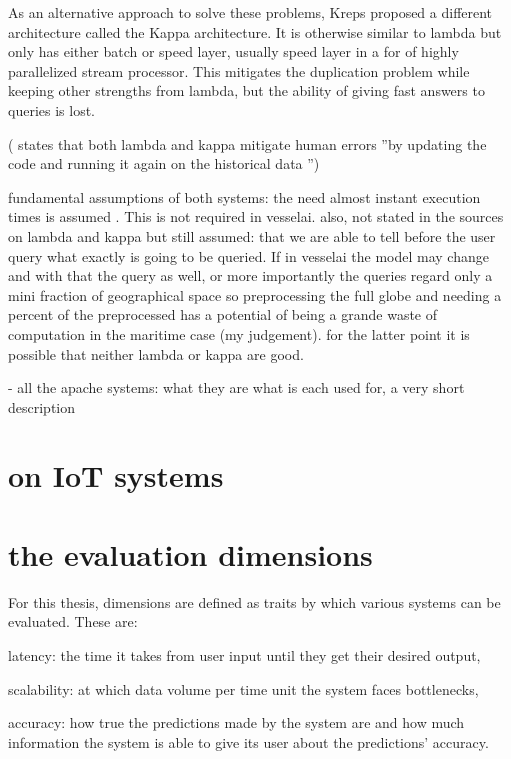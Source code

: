 As an alternative approach to solve these problems, Kreps proposed a different architecture called the Kappa architecture. It is otherwise similar to lambda but only has either batch or speed layer, usually speed layer in a for of highly parallelized stream processor. This mitigates the duplication problem while keeping other strengths from lambda, but the ability of giving fast answers to queries is lost.

(\cite{D1.1} states that both lambda and kappa mitigate human errors ''by  updating  the  code  and  running  it  again  on  the historical  data '')


fundamental assumptions of both systems:  the need almost instant execution times is assumed \cite{lambdakappa}. This is not required in vesselai. also, not stated in the sources on lambda and kappa but still assumed: that we are able to tell before the user query what exactly is going to be queried. If in vesselai the model may change and with that the query as well, or more importantly the queries regard only a mini fraction of geographical space so preprocessing the full globe and needing a percent of the preprocessed has a potential of being a grande waste of computation in the maritime case (my judgement). for the latter point it is possible that neither lambda or kappa are good.

- all the apache systems: what they are what is each used for, a very short description

\section{on IoT systems}

\section{the evaluation dimensions}

For this thesis, dimensions are defined as traits by which various systems can be evaluated. These are:

latency: the time it takes from user input until they get their desired output,

scalability: at which data volume per time unit the system faces bottlenecks,

accuracy: how true the predictions made by the system are and how much information the system is able to give its user about the predictions' accuracy.

